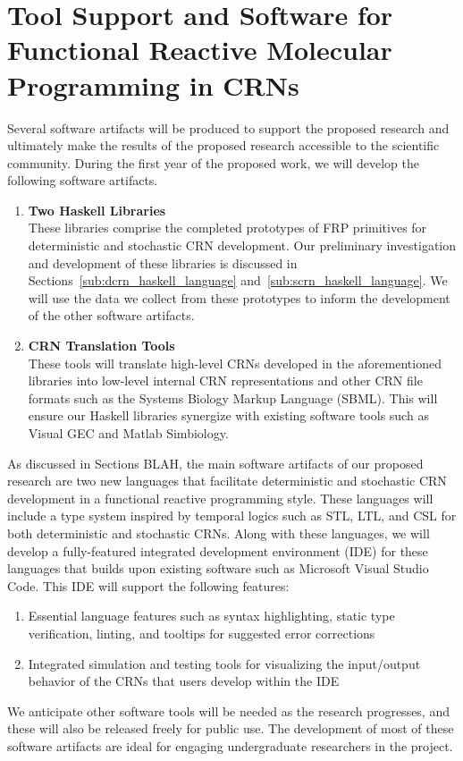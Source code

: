 
\section{Tool Support and Software for Functional Reactive Molecular Programming in CRNs}
\label{sec:software_support}

Several software artifacts will be produced to support the proposed research and ultimately make the results of the proposed research accessible to the scientific community.
During the first year of the proposed work, we will develop the following software artifacts.
\begin{enumerate}
	\item \textbf{Two Haskell Libraries}\\
    These libraries comprise the completed prototypes of FRP primitives for deterministic and stochastic CRN development.
	Our preliminary investigation and development of these libraries is discussed in Sections~\ref{sub:dcrn_haskell_language} and~\ref{sub:scrn_haskell_language}.
	We will use the data we collect from these prototypes to inform the development of the other software artifacts.
	
	\item \textbf{CRN Translation Tools}\\
    These tools will translate high-level CRNs developed in the aforementioned libraries into low-level internal CRN representations and other CRN file formats such as the Systems Biology Markup Language (SBML).
	This will ensure our Haskell libraries synergize with existing software tools such as Visual GEC and Matlab Simbiology.
\end{enumerate}

As discussed in Sections BLAH, the main software artifacts of our proposed research are two new languages that facilitate deterministic and stochastic CRN development in a functional reactive programming style.
These languages will include a type system inspired by temporal logics such as STL, LTL, and CSL for both deterministic and stochastic CRNs.
Along with these languages, we will develop a fully-featured integrated development environment (IDE) for these languages that builds upon existing software such as Microsoft Visual Studio Code.
This IDE will support the following features:
\begin{enumerate}
	\item Essential language features such as syntax highlighting, static type verification, linting, and tooltips for suggested error corrections

	\item Integrated simulation and testing tools for visualizing the input/output behavior of the CRNs that users develop within the IDE
\end{enumerate}

We anticipate other software tools will be needed as the research progresses, and these will also be released freely for public use.
The development of most of these software artifacts are ideal for engaging undergraduate researchers in the project.
